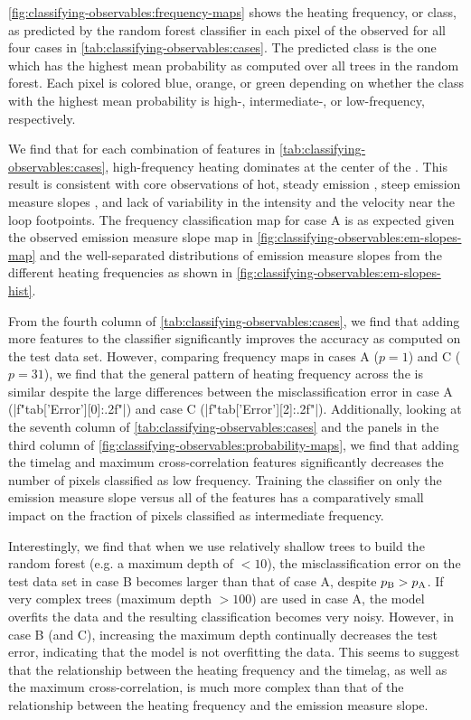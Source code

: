 \autoref{fig:classifying-observables:frequency-maps} shows the heating frequency, or class, as predicted by the random forest classifier in each pixel of the observed \AR{} for all four cases in \autoref{tab:classifying-observables:cases}. The predicted class is the one which has the highest mean probability as computed over all trees in the random forest. Each pixel is colored blue, orange, or green depending on whether the class with the highest mean probability is high-, intermediate-, or low-frequency, respectively.

We find that for each combination of features in \autoref{tab:classifying-observables:cases}, high-frequency heating dominates at the center of the \AR{}. This result is consistent with \AR{} core observations of hot, steady emission \citep{warren_evidence_2010,warren_constraints_2011}, steep emission measure slopes \citep[e.g.][]{winebarger_using_2011,del_zanna_evolution_2015}, and lack of variability in the intensity \citep[e.g.][]{antiochos_constraints_2003} and the velocity \citep{brooks_flows_2009} near the loop footpoints. The frequency classification map for case A is as expected given the observed emission measure slope map in \autoref{fig:classifying-observables:em-slopes-map} and the well-separated distributions of emission measure slopes from the different heating frequencies as shown in \autoref{fig:classifying-observables:em-slopes-hist}.

From the fourth column of \autoref{tab:classifying-observables:cases}, we find that adding more features to the classifier significantly improves the accuracy as computed on the test data set. However, comparing frequency maps in cases A ($p=1$) and C ($p=31$), we find that the general pattern of heating frequency across the \AR{} is similar despite the large differences between the misclassification error in case A (|f"{tab['Error'][0]:.2f}"|) and case C (|f"{tab['Error'][2]:.2f}"|). Additionally, looking at the seventh column of \autoref{tab:classifying-observables:cases} and the panels in the third column of \autoref{fig:classifying-observables:probability-maps}, we find that adding the timelag and maximum cross-correlation features significantly decreases the number of pixels classified as low frequency. Training the classifier on only the emission measure slope versus all of the features has a comparatively small impact on the fraction of pixels classified as intermediate frequency.

Interestingly, we find that when we use relatively shallow trees to build the random forest (e.g. a maximum depth of $<10$), the misclassification error on the test data set in case B becomes larger than that of case A, despite $p_\textup{B}>p_\textup{A}$. If very complex trees (maximum depth $>100$) are used in case A, the model overfits the data and the resulting classification becomes very noisy. However, in case B (and C), increasing the maximum depth continually decreases the test error, indicating that the model is not overfitting the data. This seems to suggest that the relationship between the heating frequency and the timelag, as well as the maximum cross-correlation, is much more complex than that of the relationship between the heating frequency and the emission measure slope.

